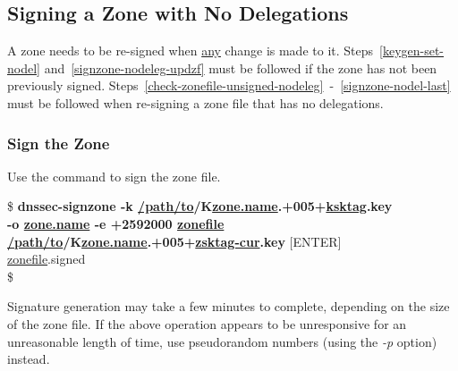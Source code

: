 
\clearpage
\subsection{Signing a Zone with No Delegations}
\label{signzone-nodel}

A zone needs to be re-signed when \underline{any} change is made to it.
Steps~\ref{keygen-set-nodel} and~\ref{signzone-nodeleg-updzf}
must be followed if the zone has not been previously signed.
Steps~\ref{check-zonefile-unsigned-nodeleg}~-~\ref{signzone-nodel-last}
must be followed when re-signing a zone file that has no
delegations.

		\label{keygen-set-nodel}
		\label{signzone-nodeleg-updzf}

	\label{check-zonefile-unsigned-nodeleg}




\subsubsection{Sign the Zone}
\label{signzone-no-deleg}

Use the  command to sign the zone file.

\begin{tabbing}
\hspace{0.5in}\$ {\bf dnssec-signzone -k \underline{/path/to}/K\underline{zone.name}.+005+\underline{ksktag}.key} \\
\hspace{0.5in} {\bf -o \underline{zone.name} -e +2592000 \underline{zonefile}} \\
\hspace{0.5in} {\bf \underline{/path/to}/K\underline{zone.name}.+005+\underline{zsktag-cur}.key} $[$ENTER$]$ \\
\hspace{0.5in} \underline{zonefile}.signed \\
\hspace{0.5in}\$ \\
\end{tabbing}

Signature generation may take a few minutes to complete, depending on the size
of the zone file. If the above operation appears to be unresponsive for an
unreasonable length of time, use pseudorandom numbers (using the {\it -p}
option) instead.


